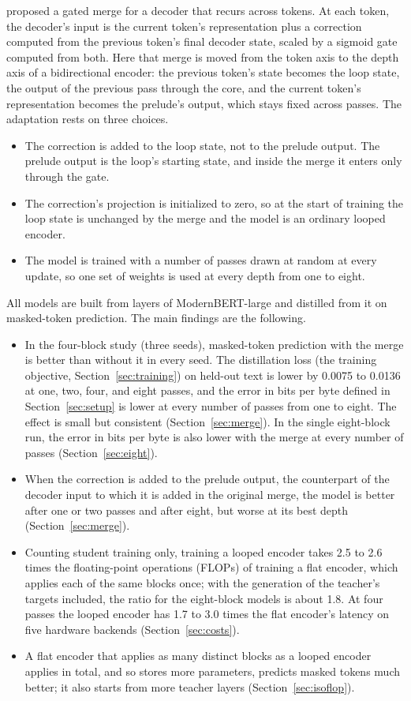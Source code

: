 \documentclass[11pt]{article}
\begin{document}
\citet{zhang2026rlt} proposed a gated merge for a decoder that recurs across tokens. At each token, the decoder's input is the current token's
representation plus a correction computed from the previous token's final decoder state, scaled by a sigmoid gate computed from both. Here that merge is moved from the token axis to the depth axis of a bidirectional encoder: the previous token's state
becomes the loop state, the output of the previous pass through the core, and the current token's representation becomes the prelude's output,
which stays fixed across passes. The adaptation rests on three choices.
\begin{itemize}
\item The correction is added to the loop state, not to the prelude output. The prelude output is the loop's starting state, and inside the
merge it enters only through the gate.
\item The correction's projection is initialized to zero, so at the start of training the loop state is unchanged by the merge and the
model is an ordinary looped encoder.
\item The model is trained with a number of passes drawn at random at every update, so one set of weights is used at every depth from one to
eight.
\end{itemize}

All models are built from layers of ModernBERT-large \citep{warner2024modernbert} and distilled from it on masked-token prediction. The main
findings are the following.
\begin{itemize}
\item In the four-block study (three seeds), masked-token prediction with the merge is better than without it in every seed. The
distillation loss (the training objective, Section~\ref{sec:training}) on held-out text is lower by 0.0075 to 0.0136 at one, two, four, and eight passes, and the error in bits per byte defined in
Section~\ref{sec:setup} is lower at every number of passes from one to eight. The effect is small but consistent (Section~\ref{sec:merge}).
In the single eight-block run, the error in bits per byte is also lower with the merge at every number of passes (Section~\ref{sec:eight}).
\item When the correction is added to the prelude output, the counterpart of the decoder input to which it is added in the original merge,
the model is better after one or two passes and after eight, but worse at its best depth (Section~\ref{sec:merge}).
\item Counting student training only, training a looped encoder takes 2.5 to 2.6 times the floating-point operations (FLOPs) of training a
flat encoder, which applies each of the same blocks once; with the generation of the teacher's targets included, the ratio for the eight-block
models is about 1.8. At four passes the looped encoder has 1.7 to 3.0 times the flat encoder's latency on five hardware backends
(Section~\ref{sec:costs}).
\item A flat encoder that applies as many distinct blocks as a looped encoder applies in total, and so stores more parameters, predicts masked
tokens much better; it also starts from more teacher layers (Section~\ref{sec:isoflop}).
\end{itemize}
\end{document}
